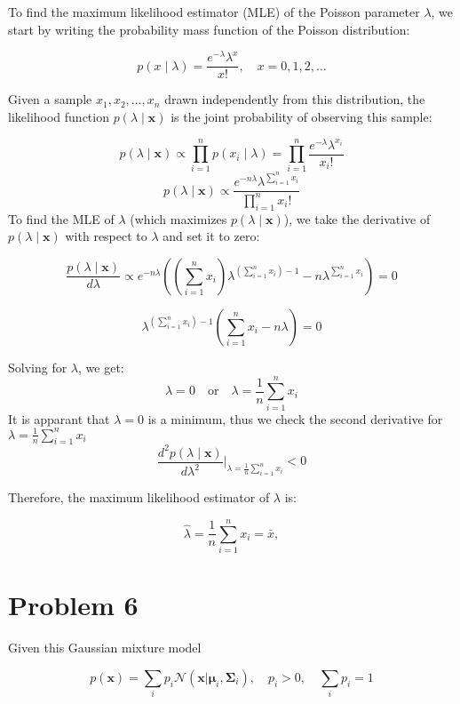 \documentclass{article}
\begin{document}
To find the maximum likelihood estimator (MLE) of the Poisson parameter \(\lambda\), we start by writing the probability mass function of the Poisson distribution:

\[
p(x \mid \lambda) = \frac{e^{-\lambda} \lambda^x}{x!}, \quad x = 0, 1, 2, \dots
\]

Given a sample \( x_1, x_2, \dots, x_n \) drawn independently from this distribution, the likelihood function \( p(\lambda \mid \boldsymbol{x}) \) is the joint probability of observing this sample:


\begin{equation*}    
p(\lambda \mid \boldsymbol{x}) \propto \prod_{i=1}^n p(x_i \mid \lambda) = \prod_{i=1}^n \frac{e^{-\lambda} \lambda^{x_i}}{x_i!}
\end{equation*}
\begin{equation*}    
p(\lambda \mid \boldsymbol{x}) \propto  \frac{e^{-n\lambda} \lambda^{\sum_{i=1}^n x_i}}{\prod_{i=1}^n x_i!}
\end{equation*}
To find the MLE of \(\lambda\) (which maximizes $p(\lambda \mid \boldsymbol{x})$), we take the derivative of \( p(\lambda \mid \boldsymbol{x})\) with respect to \(\lambda\) and set it to zero:

\[
\frac{p(\lambda \mid \boldsymbol{x})}{d\lambda} \propto e^{-n\lambda}  \left((\sum_{i=1}^n x_i)\lambda^{(\sum_{i=1}^n x_i) -1} -n \lambda^{\sum_{i=1}^n x_i} \right)  = 0
\]

\[
\lambda^{(\sum_{i=1}^n x_i) -1}\left(\sum_{i=1}^n x_i -n \lambda \right)  = 0
\]

Solving for \(\lambda\), we get:
\[
\lambda = 0 \quad \text{or} \quad \lambda = \frac{1}{n} \sum_{i=1}^n x_i
\]
It is apparant that $\lambda =0 $ is a minimum, thus we check the second derivative for $\lambda = \frac{1}{n} \sum_{i=1}^n x_i$
\[
\frac{d^2 p(\lambda \mid \boldsymbol{x})}{d\lambda^2} \bigg|_{\lambda = \frac{1}{n} \sum_{i=1}^n x_i} < 0
\]

Therefore, the maximum likelihood estimator of \(\lambda\) is:

\[
\hat{\lambda} = \frac{1}{n} \sum_{i=1}^n x_i = \bar{x},
\]

\section*{Problem 6}

Given this Gaussian mixture model

\begin{equation*}
    p(\mathbf{x}) = \sum_i p_i \mathcal{N}(\mathbf{x} | \boldsymbol{\mu}_i, \boldsymbol{\Sigma}_i), \quad p_i > 0, \quad \sum_i p_i = 1
\end{equation*}
\end{document}
